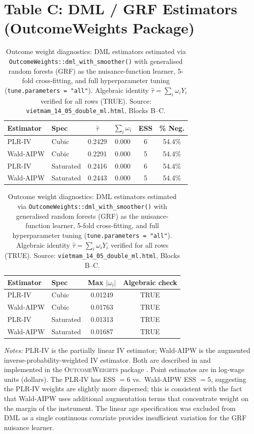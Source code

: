 \documentclass[12pt, a4paper]{article}
\begin{document}
\clearpage
\section*{Table C: DML / GRF Estimators (OutcomeWeights Package)}

\begin{table}[ht]
\centering
\caption{Outcome weight diagnostics: DML estimators estimated via
  \texttt{OutcomeWeights::dml\_with\_smoother()} with generalised random
  forests (GRF) as the nuisance-function learner, 5-fold cross-fitting,
  and full hyperparameter tuning (\texttt{tune.parameters = "all"}).
  Algebraic identity $\hat{\tau} = \sum_i \omega_i Y_i$ verified for all
  rows (TRUE). Source: \texttt{vietmam\_14\_05\_double\_ml.html}, Blocks B--C.}
\label{tab:dml_grf}
\vspace{6pt}
\begin{tabular}{llcccc}
\toprule
\textbf{Estimator} & \textbf{Spec} & $\hat{\tau}$ & $\sum_i \omega_i$ &
  \textbf{ESS} & \textbf{\% Neg.} \\
\midrule
\rowcolor{dmlblue}
PLR-IV   & Cubic     & 0.2429 & $0.000$ & 6 & 54.4\% \\
\rowcolor{dmlblue}
Wald-AIPW & Cubic    & 0.2291 & $0.000$ & 5 & 54.4\% \\
\midrule
\rowcolor{dmlblue}
PLR-IV   & Saturated & 0.2416 & $0.000$ & 6 & 54.4\% \\
\rowcolor{dmlblue}
Wald-AIPW & Saturated & 0.2443 & $0.000$ & 5 & 54.4\% \\
\bottomrule
\end{tabular}
\vspace{4pt}

\begin{tabular}{llcc}
\toprule
\textbf{Estimator} & \textbf{Spec} & \textbf{Max $|\omega_i|$} &
  \textbf{Algebraic check} \\
\midrule
PLR-IV   & Cubic     & 0.01249 & TRUE \\
Wald-AIPW & Cubic    & 0.01763 & TRUE \\
PLR-IV   & Saturated & 0.01313 & TRUE \\
Wald-AIPW & Saturated & 0.01687 & TRUE \\
\bottomrule
\end{tabular}
\smallskip

\noindent\footnotesize
\textit{Notes:}
PLR-IV is the partially linear IV estimator; Wald-AIPW is the augmented
inverse-probability-weighted IV estimator. Both are described in
\citet{chernozhukov2018double} and implemented in the
\textsc{OutcomeWeights} package \citep{knaus2024outcome}. Point estimates
are in log-wage units (dollars). The PLR-IV has ESS $= 6$ vs.\ Wald-AIPW
ESS $= 5$, suggesting the PLR-IV weights are slightly more dispersed; this
is consistent with the fact that Wald-AIPW uses additional augmentation
terms that concentrate weight on the margin of the instrument. The linear
age specification was excluded from DML as a single continuous covariate
provides insufficient variation for the GRF nuisance learner.
\end{table}
\end{document}

